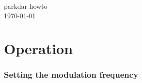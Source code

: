 
\newcommand{\isdraft}{1} %

\graphicspath{
              {figs/} %
}



\thispagestyle{empty}   %
\vspace*{\fill}
\begin{center}
    {\huge parkdar howto}\\
    \today
\end{center}
\vspace*{\fill}
\clearpage

\pagestyle{toc}
\tableofcontents
\clearpage
\pagestyle{normal}

\part{Operation}
    \section{Setting the modulation frequency}
        





\appendix{} %
\noappendicestocpagenum{}   %
\appendixpage{} %
\addappheadtotoc{}  %

%


